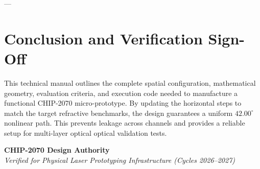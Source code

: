 \documentclass[11pt,a4paper]{article}
\begin{document}
---

\section{Conclusion and Verification Sign-Off}
This technical manual outlines the complete spatial configuration, mathematical geometry, evaluation criteria, and execution code needed to manufacture a functional CHIP-2070 micro-prototype. By updating the horizontal steps to match the target refractive benchmarks, the design guarantees a uniform $42.00^\circ$ nonlinear path. This prevents leakage across channels and provides a reliable setup for multi-layer optical optical validation tests.

\vspace{1cm}
\begin{flushright}
\textbf{CHIP-2070 Design Authority} \\
\textit{Verified for Physical Laser Prototyping Infrastructure (Cycles 2026--2027)}
\end{flushright}
\end{document}
